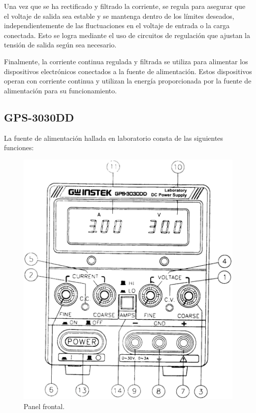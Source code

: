 \documentclass[letter,twoside,11pt]{article}
\begin{document}
Una vez que se ha rectificado y filtrado la corriente, se regula para asegurar
que el voltaje de salida sea estable y se mantenga dentro de los límites
deseados, independientemente de las fluctuaciones en el voltaje de entrada o la
carga conectada. Esto se logra mediante el uso de circuitos de regulación que
ajustan la tensión de salida según sea necesario.

Finalmente, la corriente continua regulada y filtrada se utiliza para alimentar
los dispositivos electrónicos conectados a la fuente de alimentación. Estos
dispositivos operan con corriente continua y utilizan la energía proporcionada
por la fuente de alimentación para su funcionamiento.

\subsection{GPS-3030DD}
La fuente de alimentación hallada en laboratorio consta de las siguientes
funciones:

\begin{figure}[!h]
\centering
\includegraphics[scale=0.25]{figura1.eps}
\caption{Panel frontal.}
\end{figure}
\end{document}
